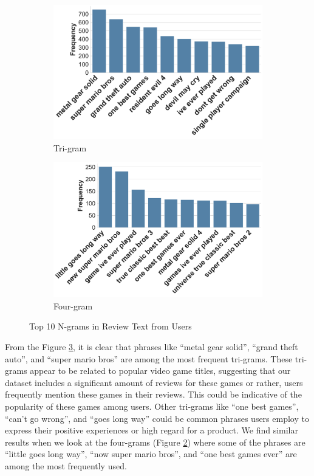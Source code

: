 \begin{figure}[h]
  \centering
  \begin{subfigure}{0.48\textwidth}
      \includegraphics[width=\textwidth]{Figures/trigrams.pdf} %
      \caption{Tri-gram}
      \label{fig:tri-grams}
  \end{subfigure}
  \hfill
  \begin{subfigure}{0.48\textwidth}
      \includegraphics[width=\textwidth]{Figures/fourgrams.pdf} %
      \caption{Four-gram}
      \label{fig:four-grams}
  \end{subfigure}
  \caption{Top 10 N-grams in Review Text from Users}
  \label{fig:n-grams}
\end{figure}

From the Figure \ref{fig:n-grams}, it is clear that phrases like “metal gear solid”, “grand theft auto”, and “super mario bros” are among the most frequent tri-grams. These tri-grams appear to be related to popular video game titles, suggesting that our dataset includes a significant amount of reviews for these games or rather, users frequently mention these games in their reviews. This could be indicative of the popularity of these games among users. Other tri-grams like “one best games”, “can’t go wrong”, and “goes long way” could be common phrases users employ to express their positive experiences or high regard for a product.  We find similar results when we look at the four-grams (Figure \ref{fig:four-grams}) where some of the phrases are  “little goes long way”, “now super mario bros”, and “one best games ever” are among the most frequently used. 


